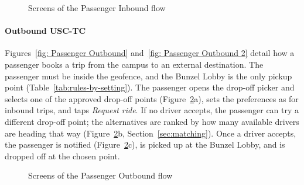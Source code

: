 
    \begin{figure}[htbp]
        \centering
        \hfill
        \hfill
        \hfill
        \caption{Screens of the Passenger Inbound flow}
        \label{fig:ui-pax-inbound}
    \end{figure}

\paragraph{Outbound USC-TC} Figures~\ref{fig: Passenger Outbound} and~\ref{fig: Passenger Outbound 2} detail how a passenger books a trip from the campus to an external destination. The passenger must be inside the geofence, and the Bunzel Lobby is the only pickup point (Table~\ref{tab:rules-by-setting}). The passenger opens the drop-off picker and selects one of the approved drop-off points (Figure~\ref{fig:ui-pax-outbound}a), sets the preferences as for inbound trips, and taps \emph{Request ride}. If no driver accepts, the passenger can try a different drop-off point; the alternatives are ranked by how many available drivers are heading that way (Figure~\ref{fig:ui-pax-outbound}b, Section~\ref{sec:matching}). Once a driver accepts, the passenger is notified (Figure~\ref{fig:ui-pax-outbound}c), is picked up at the Bunzel Lobby, and is dropped off at the chosen point.



    \begin{figure}[htbp]
        \centering
        \hfill
        \hfill
        \caption{Screens of the Passenger Outbound flow}
        \label{fig:ui-pax-outbound}
    \end{figure}

